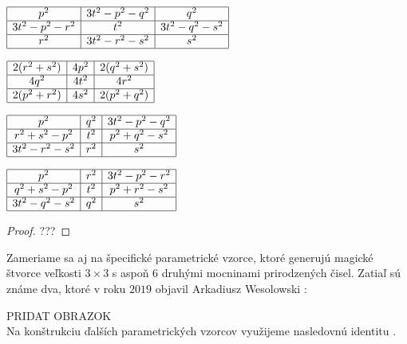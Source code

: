\begin{center}
$\begin{array}{ |c|c|c| } 
\hline
p^2 & 3t^2 - p^2 - q^2 & q^2 \\ 
\hline
3t^2 - p^2 - r^2 & t^2 & 3t^2 - q^2 - s^2 \\ 
\hline
r^2 & 3t^2 - r^2 - s^2 & s^2 \\
\hline
\end{array}$

$\begin{array}{ |c|c|c| } 
\hline
2(r^2 + s^2) & 4p^2 & 2(q^2 + s^2) \\ 
\hline
4q^2 & 4t^2 & 4r^2 \\ 
\hline
2(p^2 + r^2) & 4s^2 & 2(p^2 + q^2) \\
\hline
\end{array}$

$\begin{array}{ |c|c|c| } 
\hline
p^2 & q^2 & 3t^2 - p^2 - q^2 \\ 
\hline
r^2 + s^2 - p^2 & t^2 & p^2 + q^2 - s^2 \\ 
\hline
3t^2 - r^2 - s^2 & r^2 & s^2 \\
\hline
\end{array}$

$\begin{array}{ |c|c|c| } 
\hline
p^2 & r^2 & 3t^2 - p^2 - r^2 \\ 
\hline
q^2 + s^2 - p^2 & t^2 & p^2 + r^2 - s^2 \\ 
\hline
3t^2 - q^2 - s^2 & q^2 & s^2 \\
\hline
\end{array}$
\end{center}

\begin{proof} 
???
\end{proof}

Zameriame sa aj na špecifické parametrické vzorce, ktoré generujú magické štvorce veľkosti $3 \times 3$ s aspoň $6$ druhými mocninami prirodzených čisel. Zatiaľ sú známe dva, ktoré v roku $2019$ objavil Arkadiusz Wesolowski \cite{multimagie}:

PRIDAT OBRAZOK \\

Na konštrukciu ďalších parametrických vzorcov využijeme nasledovnú identitu \cite{algebraic}.


